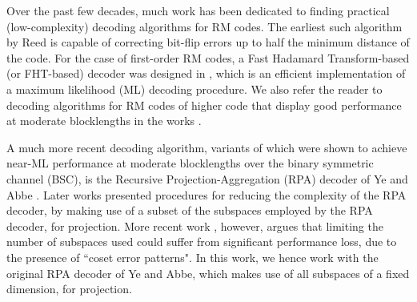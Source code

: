 \documentclass[conference,letterpaper]{IEEEtran}
\begin{document}

Over the past few decades, much work has been dedicated to finding practical (low-complexity) decoding algorithms for RM codes. The earliest such algorithm by Reed \cite{reed} is capable of correcting bit-flip errors up to half the minimum distance of the code. For the case of first-order RM codes, a Fast Hadamard Transform-based (or FHT-based) decoder was designed in \cite{fht2,fht}, which is an efficient implementation of a maximum likelihood (ML) decoding procedure. We also refer the reader to decoding algorithms for RM codes of higher code that display good performance at moderate blocklengths in the works \cite{sidelnikov,sakkour,dumer1,dumer2,dumer3,dumer_burnashev}. 

A much more recent decoding algorithm, variants of which were shown to achieve near-ML performance at moderate blocklengths over the binary symmetric channel (BSC), is the Recursive Projection-Aggregation (RPA) decoder of Ye and Abbe \cite{rpa}. 
Later works \cite{rpacomplex1,rpacomplex2} presented procedures for reducing the complexity of the RPA decoder, by making use of a subset of the subspaces employed by the RPA decoder, for projection. More recent work \cite{coset-error-it}, however, argues that limiting the number of subspaces used could suffer from significant performance loss, due to the presence of ``coset error patterns". In this work, we hence work with the original RPA decoder of Ye and Abbe, which makes use of all subspaces of a fixed dimension, for projection.
\end{document}
